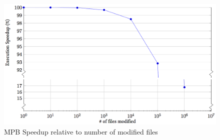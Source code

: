     \begin{figure}[H]
      \centering
      \includegraphics[width=\linewidth]{Images/watchdir-mbp.png}
      \caption{MPB Speedup relative to number of modified files}
      \label{fig:mpb-watch-graph}
    \end{figure}

